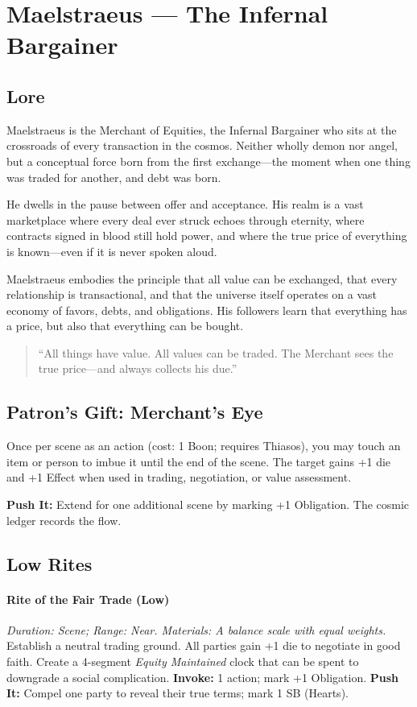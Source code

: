 \section{Maelstraeus --- The Infernal Bargainer}
\label{patron:maelstraeus}

\subsection*{Lore}
%
Maelstraeus is the Merchant of Equities, the Infernal Bargainer who sits at the crossroads of every transaction in the cosmos. Neither wholly demon nor angel, but a conceptual force born from the first exchange---the moment when one thing was traded for another, and debt was born.  

He dwells in the pause between offer and acceptance. His realm is a vast marketplace where every deal ever struck echoes through eternity, where contracts signed in blood still hold power, and where the true price of everything is known---even if it is never spoken aloud.  

Maelstraeus embodies the principle that all value can be exchanged, that every relationship is transactional, and that the universe itself operates on a vast economy of favors, debts, and obligations. His followers learn that everything has a price, but also that everything can be bought.  

\begin{quote}
``All things have value. All values can be traded. The Merchant sees the true price---and always collects his due.''
\end{quote}

\subsection*{Patron's Gift: Merchant's Eye}
Once per scene as an action (cost: 1 Boon; requires Thiasos), you may touch an item or person to imbue it until the end of the scene. The target gains +1 die and +1 Effect when used in trading, negotiation, or value assessment.  

\textbf{Push It:} Extend for one additional scene by marking +1 Obligation. The cosmic ledger records the flow.

\subsection*{Low Rites}
\paragraph{Rite of the Fair Trade (Low)}  
\emph{Duration: Scene; Range: Near. Materials: A balance scale with equal weights.}  
Establish a neutral trading ground. All parties gain +1 die to negotiate in good faith. Create a 4-segment \emph{Equity Maintained} clock that can be spent to downgrade a social complication.  
\textbf{Invoke:} 1 action; mark +1 Obligation.  
\textbf{Push It:} Compel one party to reveal their true terms; mark 1 SB (Hearts).

